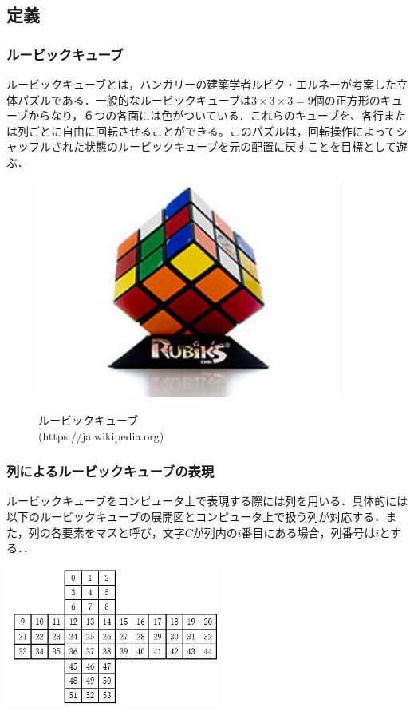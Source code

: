 \documentclass[titlepage]{jarticle}
\begin{document}
\subsection{定義}
\subsubsection{ルービックキューブ}
ルービックキューブとは，ハンガリーの建築学者ルビク・エルネーが考案した立体パズルである．一般的なルービックキューブは\(3\times 3\times 3=9\)個の正方形のキューブからなり，６つの各面には色がついている．これらのキューブを、各行または列ごとに自由に回転させることができる。このパズルは，回転操作によってシャッフルされた状態のルービックキューブを元の配置に戻すことを目標として遊ぶ．\\

\begin{figure}
  \centering
  \includegraphics[width=10cm]{./tex_pic/rubik-cube.jpg}\\
  \caption{ルービックキューブ\\(https://ja.wikipedia.org)}
\end{figure}

\subsubsection{列によるルービックキューブの表現}
ルービックキューブをコンピュータ上で表現する際には列を用いる．具体的には以下のルービックキューブの展開図とコンピュータ上で扱う列が対応する．また，列の各要素をマスと呼び，文字\(C\)が列内の\(i\)番目にある場合，列番号は\(i\)とする．．\\
\begin{center}
  \includegraphics[width=7cm]{./tex_pic/seq.jpg}\\
\end{center}
\end{document}
